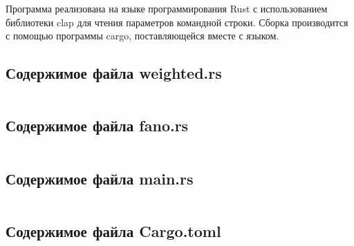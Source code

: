 \documentclass[a4paper,oneside]{article}
\theoremstyle{definition}
\begin{document}
Программа реализована на языке программирования Rust с использованием библиотеки
clap для чтения параметров командной строки. Сборка производится с помощью
программы cargo, поставляющейся вместе с языком.

\subsection{Содержимое файла weighted.rs}
\inputminted{rust}{../../lab2/src/weighted.rs}

\subsection{Содержимое файла fano.rs}
\inputminted{rust}{../../lab2/src/fano.rs}

\subsection{Содержимое файла main.rs}
\inputminted{rust}{../../lab2/src/main.rs}

\subsection{Содержимое файла Cargo.toml}
\inputminted{toml}{../../lab2/Cargo.toml}
\end{document}
